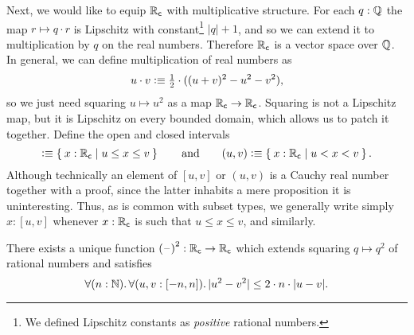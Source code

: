 %
Next, we would like to equip $\mathbb{R}_\mathsf{c}$ with multiplicative structure. For each $q : \mathbb{Q}$ the
map $r \mapsto q \cdot r$ is Lipschitz with constant\footnote{We defined Lipschitz
  constants as \emph{positive} rational numbers.} $|q| + 1$, and so we can extend it to
multiplication by $q$ on the real numbers. Therefore $\mathbb{R}_\mathsf{c}$ is a vector space over $\mathbb{Q}$.
In general, we can define multiplication of real numbers as
%
\begin{equation}
  u \cdot v \defeq
  {\textstyle \frac{1}{2}} \cdot ((u + v)^2 - u^2 - v^2),\label{mult-from-square}
\end{equation}
%
so we just need squaring $u \mapsto u^2$ as a map $\mathbb{R}_\mathsf{c} \to \mathbb{R}_\mathsf{c}$. Squaring is not a
Lipschitz map, but it is Lipschitz on every bounded domain, which allows us to patch it
together. Define the open and closed intervals
%
%
%
%
\begin{equation*}
  [u,v] \defeq \setof{ x : \RC | u \leq x \leq v }
  \qquad\text{and}\qquad
  (u,v) \defeq \setof{ x : \RC | u < x < v }.
\end{equation*}
%
Although technically an element of $[u,v]$ or $(u,v)$ is a Cauchy real number together with a proof, since the latter inhabits a mere proposition it is uninteresting.
Thus, as is common with subset types, we generally write simply $x:[u,v]$ whenever $x:\mathbb{R}_\mathsf{c}$ is such that $u\leq x \leq v$, and similarly.

\begin{thm} \label{RC-squaring}
  There exists a unique function ${(\mathord{\hspace{1pt}\text{--}\hspace{1pt}})}^2 : \mathbb{R}_\mathsf{c} \to \mathbb{R}_\mathsf{c}$ which extends squaring $q \mapsto
  q^2$ of rational numbers and satisfies
  \begin{equation*}
    \fall{n : \N}
    \fall{u, v : [-n, n]}
    |u^2 - v^2| \leq 2 \cdot n \cdot |u - v|.
  \end{equation*}
\end{thm}

